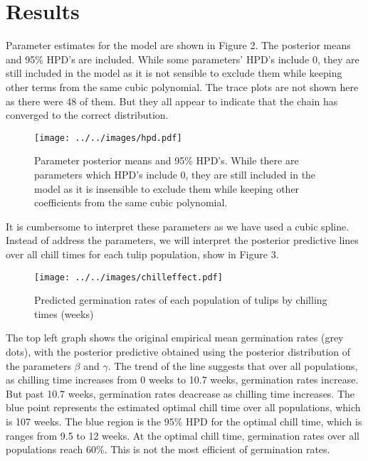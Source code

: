 \documentclass[mathserif]{article}
\def\beginmyfig{\begin{figure}[htbp]\begin{center}}
\def\endmyfig{\end{center}\end{figure}}
\begin{document}
\section*{Results}
Parameter estimates for the model are shown in Figure 2. The posterior means and
95\% HPD's are included. While some parameters' HPD's include 0, they are still
included in the model as it is not sensible to exclude them while keeping other
terms from the same cubic polynomial. The trace plots are not shown here as
there were 48 of them. But they all appear to indicate that the chain has
converged to the correct distribution.
\beginmyfig
  \texttt{[image: ../../images/hpd.pdf]}
  \caption{Parameter posterior means and 95\% HPD's. While there
           are parameters which HPD's include 0, they are still
           included in the model as it is insensible to
           exclude them while keeping other coefficients from
           the same cubic polynomial.}
\endmyfig  
It is cumbersome to interpret these parameters as we have used a cubic spline.
Instead of address the parameters, we will interpret the posterior predictive
lines over all chill times for each tulip population, show in Figure 3.
\beginmyfig
  \texttt{[image: ../../images/chilleffect.pdf]}
  \vspace{-2mm}
  \caption{Predicted germination rates of each population of tulips by
           chilling times (weeks)}
\endmyfig
The top left graph shows the original empirical mean germination rates (grey
dots), with the posterior predictive obtained using the posterior distribution
of the parameters $\beta$ and $\gamma$. The trend of the line suggests that
over all populations, as chilling time increases from 0 weeks to 10.7 weeks,
germination rates increase. But past 10.7 weeks, germination rates deacrease as
chilling time increases. The blue point represents the estimated optimal chill
time over all populations, which is 107 weeks. The blue region is the 95\% HPD
for the optimal chill time, which is ranges from 9.5 to 12 weeks. At the
optimal chill time, germination rates over all populations reach 60\%. This is
not the most efficient of germination rates.\\
\end{document}
